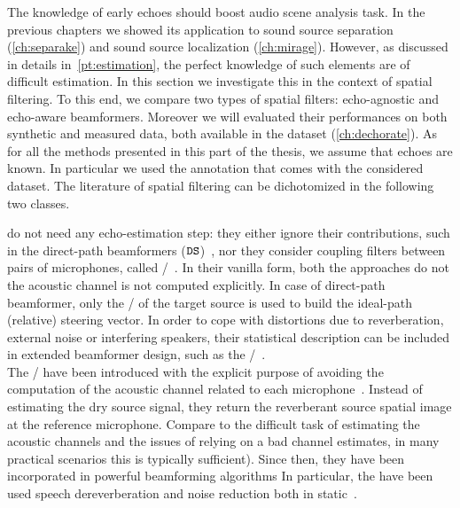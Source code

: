 The knowledge of early echoes should boost audio scene analysis task.
In the previous chapters we showed its application to sound source separation (\cref{ch:separake}) and sound source localization (\cref{ch:mirage}).
However, as discussed in details in~\cref{pt:estimation}, the perfect knowledge of such elements are of difficult estimation.
In this section we investigate this in the context of spatial filtering.
To this end, we compare two types of spatial filters: echo-agnostic and echo-aware beamformers.
Moreover we will evaluated their performances on both synthetic and measured data, both available in the \dEchorate{} dataset (\cref{ch:dechorate}).
As for all the methods presented in this part of the thesis, we assume that echoes are known.
In particular we used the annotation that comes with the considered dataset.
The literature of spatial filtering can be dichotomized in the following two classes.

 do not need any echo-estimation step:
they either ignore their contributions, such in the direct-path beamformers ($\mathtt{DS}$)~, nor they consider coupling filters between pairs of microphones, called \ReIRdef/~.
In their vanilla form, both the approaches do not the acoustic channel is not computed explicitly.
In case of direct-path beamformer, only the \DOAs/ of the target source is used to build the ideal-path (relative) steering vector.
In order to cope with distortions due to reverberation, external noise or interfering speakers, their statistical description can be included in extended beamformer design, such as the \MVDRtxt/~.
\\The \ReIRs/ have been introduced with the explicit purpose of avoiding the computation of the acoustic channel related to each microphone~.
Instead of estimating the dry source signal, they return the reverberant source spatial image at the reference microphone.
Compare to the difficult task of estimating the acoustic channels and the issues of relying on a bad channel estimates, in many practical scenarios this is typically sufficient).
Since then, they have been incorporated in powerful beamforming algorithms
In particular, the have been used speech dereverberation and noise reduction both in static~.

